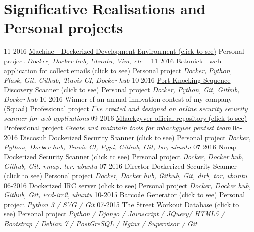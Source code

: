 \documentclass[]{friggeri-cv}
\begin{document}
\newpage
\section{Significative Realisations and Personal projects}
\begin{entrylist}
  \entry
  	{11-2016}
    {\href{https://github.com/4383/machine}{Machine - Dockerized Development Environment (click to see)}}
    {Personal project}
	{\emph{Docker, Docker hub, Ubuntu, Vim, etc...}}
  \entry
  	{11-2016}
    {\href{https://github.com/4383/Botanick}{Botanick - web application for collect emails (click to see)}}
    {Personal project}
	{\emph{Docker, Python, Flask, Git, Github, Travis-CI, Docker hub}}
  \entry
  	{10-2016}
    {\href{https://github.com/mhackgyver-squad/porno-king}{Port Knocking Sequence Discovery Scanner (click to see)}}
    {Personal project}
	{\emph{Docker, Python, Git, Github, Docker hub}}
  \entry
  	{10-2016}
    {{Winner of an annual innovation contest of my company (Squad)}}
    {Professional project}
	{\emph{I've created and designed an online security security scanner for web applications}}
  \entry
  	{09-2016}
    {\href{https://github.com/mhackgyver-squad/mhackgyver}{Mhackgyver official repository (click to see)}}
    {Professional project}
	{\emph{Create and maintain tools for mhackgyver pentest team}}
  \entry
    {08-2016}
    {\href{https://hub.docker.com/r/4383/discosub}{Discosub Dockerized Security Scanner (click to see)}}
    {Personal project}
    {\emph{Docker, Python, Docker hub, Travis-CI, Pypi, Github, Git, tor, ubuntu}}
  \entry
    {07-2016}
    {\href{https://hub.docker.com/r/4383/system-service-footprint}{Nmap Dockerized Security Scanner (click to see)}}
    {Personal project}
    {\emph{Docker, Docker hub, Github, Git, nmap, tor, ubuntu}}
  \entry
    {07-2016}
    {\href{https://hub.docker.com/r/4383/director}{Director Dockerized Security Scanner (click to see)}}
    {Personal project}
    {\emph{Docker, Docker hub, Github, Git, dirb, tor, ubuntu}}
  \entry
    {06-2016}
    {\href{https://hub.docker.com/r/4383/irc-server}{Dockerized IRC server (click to see)}}
    {Personal project}
    {\emph{Docker, Docker hub, Github, Git, ircd-irc2, ubuntu}}
  \entry
    {10-2015}
    {\href{http://pypi.python.org/pypi/barcode-generator/0.1rc15}{Barcode Generator (click to see)}}
    {Personal project}
    {\emph{Python 3 / SVG / Git}}
  \entry
    {07-2015}
    {\href{http://www.the-street-workout-database.ovh}{The Street Workout Database (click to see)}}
    {Personal project}
    {\emph{Python / Django / Javascript / JQuery/ HTML5 / Bootstrap / Debian 7 / PostGreSQL / Nginx / Supervisor / Git}}

\end{entrylist}
\end{document}
